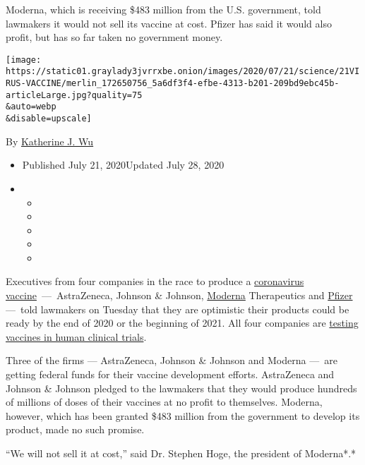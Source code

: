 Moderna, which is receiving \$483 million from the U.S. government, told
lawmakers it would not sell its vaccine at cost. Pfizer has said it
would also profit, but has so far taken no government money.

\texttt{[image: https://static01.graylady3jvrrxbe.onion/images/2020/07/21/science/21VIRUS-VACCINE/merlin\_172650756\_5a6df3f4-efbe-4313-b201-209bd9ebc45b-articleLarge.jpg?quality=75\\\&auto=webp\\\&disable=upscale]}

By
\href{https://www.nytimes3xbfgragh.onion/by/katherine-j--wu}{Katherine
J. Wu}

\begin{itemize}
\item
  Published July 21, 2020Updated July 28, 2020
\item
  \begin{itemize}
  \item
  \item
  \item
  \item
  \item
  \end{itemize}
\end{itemize}

Executives from four companies in the race to produce a
\href{https://www.nytimes3xbfgragh.onion/2020/07/27/health/moderna-vaccine-covid.html}{coronavirus
vaccine}~---~AstraZeneca, Johnson \& Johnson,
\href{https://www.nytimes3xbfgragh.onion/2020/07/28/health/coronavirus-moderna-vaccine-monkeys.html}{Moderna}
Therapeutics and
\href{https://www.nytimes3xbfgragh.onion/2020/07/27/health/moderna-vaccine-covid.html}{Pfizer}
---~told lawmakers on Tuesday that they are optimistic their products
could be ready by the end of 2020 or the beginning of 2021. All four
companies are
\href{https://www.nytimes3xbfgragh.onion/interactive/2020/science/coronavirus-vaccine-tracker.html}{testing
vaccines in human clinical trials}.

Three of the firms --- AstraZeneca, Johnson \& Johnson and Moderna
---~are getting federal funds for their vaccine development efforts.
AstraZeneca and Johnson \& Johnson pledged to the lawmakers that they
would produce hundreds of millions of doses of their vaccines at no
profit to themselves. Moderna, however, which has been granted \$483
million from the government to develop its product, made no such
promise.

``We will not sell it at cost,'' said Dr. Stephen Hoge, the president of
Moderna*.*


